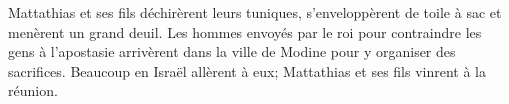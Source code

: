 Mattathias et ses fils déchirèrent leurs tuniques,
	s’enveloppèrent de toile à sac et menèrent un grand deuil.
Les hommes envoyés par le roi pour contraindre les gens à l’apostasie
	arrivèrent dans la ville de Modine pour y organiser des sacrifices.
Beaucoup en Israël allèrent à eux; Mattathias et ses fils vinrent à la réunion.
